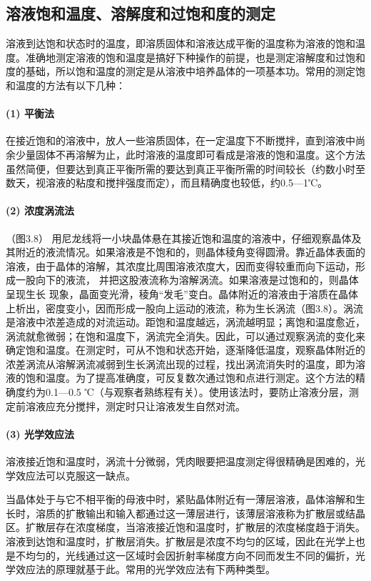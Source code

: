﻿\subsection{溶液饱和温度、溶解度和过饱和度的测定}
溶液到达饱和状态时的温度，即溶质固体和溶液达成平衡的温度称为溶液的饱和温度。准确地测定溶液的饱和温度是搞好下种操作的前提，也是测定溶解度和过饱和度的基础，所以饱和温度的测定是从溶液中培养晶体的一项基本功。常用的测定饱和温度的方法有以下几种：

\paragraph{(1) 平衡法}
在接近饱和的溶液中，放人一些溶质固体，在一定温度下不断搅拌，直到溶液中尚余少量固体不再溶解为止，此时溶液的温度即可看成是溶液的饱和温度。这个方法虽然简便，但要达到真正平衡所需的要达到真正平衡所需的时间较长（约数小时至数天，视溶液的粘度和搅拌强度而定），而且精确度也较低，约0.5—1℃。

\paragraph{(2) 浓度涡流法}
（图3.8）
用尼龙线将一小块晶体悬在其接近饱和温度的溶液中，仔细观察晶体及其附近的液流情况。如果溶液是不饱和的，则晶体稜角变得圆滑。靠近晶体表面的溶液，由于晶体的溶解，其浓度比周围溶液浓度大，因而变得较重而向下运动，形成一股向下的液流， 并把这股液流称为溶解涡流。如果溶液是过饱和的，则晶体呈现生长 现象，晶面变光滑，稜角“发毛”变白。晶体附近的溶液由于溶质在晶体上析出，密度变小，因而形成一股向上运动的液流，称为生长涡流（图3.8）。涡流是溶液中浓差造成的对流运动。距饱和温度越远，涡流越明显；离饱和温度愈近，涡流就愈微弱；在饱和温度下，涡流完全消失。因此，可以通过观察涡流的变化来确定饱和温度。在测定时，可从不饱和状态开始，逐渐降低温度，观察晶体附近的浓差涡流从溶解涡流减弱到生长涡流出现的过程，找出涡流消失时的温度，即为溶液的饱和温度。为了提高准确度，可反复数次通过饱和点进行测定。这个方法的精确度约为0.1—0.5 ℃（与观察者熟练程有关）。使用该法时，要防止溶液分层，测定前溶液应充分搅拌，测定时只让溶液发生自然对流。

\paragraph{(3) 光学效应法}
溶液接近饱和温度时，涡流十分微弱，凭肉眼要把温度测定得很精确是困难的，光学效应法可以克服这一缺点。

当晶体处于与它不相平衡的母液中时，紧贴晶体附近有一薄层溶液，晶体溶解和生长时，溶质的扩散输出和输入都通过这一薄层进行，该薄层溶液称为扩散层或结晶区。扩散层存在浓度梯度，当溶液接近饱和温度时，扩散层的浓度梯度趋于消失。溶液到达饱和温度时，扩散层消失。扩散层是浓度不均匀的区域，因此在光学上也是不均匀的，光线通过这一区域时会因折射率梯度方向不同而发生不同的偏折，光学效应法的原理就基于此。常用的光学效应法有下两种类型。

